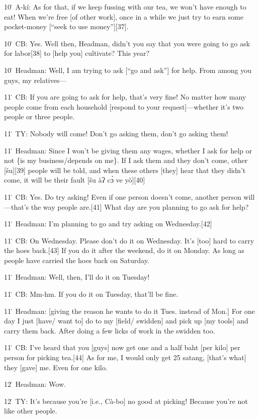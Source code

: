 10\. A-kí: As for that, if we keep fussing with our tea, we won't have enough
to eat!  When we're free [of other work], once in a while we just try to earn some
pocket-money [``seek to use money''][37].

10\. CB: Yes. Well then, Headman, didn't you say that you were going to go ask
for labor[38] to [help you] cultivate?  This year?

10\. Headman: Well, I am trying to ask [``go and ask''] for help.  From among you
guys, my relatives---

11\. CB: If you are going to ask for help, that's very fine!  No matter how many
people come from each household [respond to your request]---whether it's two people
or three people.

11\. TY: Nobody will come!  Don't go asking them, don't go asking them!

11\. Headman: Since I won't be giving them any wages, whether I ask for help or
not \{is my business/depends on me\}.  If I ask them and they don't come, other
[šu][39] people will be told, and when these others [they] hear that they didn't
come, it will be their fault [šu àʔ cɔ̀ ve yò][40]

11\. CB: Yes.  Do try asking! Even if one person doesn't come, another person will---that's
the way people are.[41]  What day are you planning to go ask for help?

11\. Headman: I'm planning to go and try asking on Wednesday.[42]

11\. CB: On Wednesday.  Please don't do it on Wednesday.  It's [too] hard to carry
the hoes back.[43]  If you do it after the weekend, do it on Monday.  As long as
people have carried the hoes back on Saturday.

11\. Headman: Well, then, I'll do it on Tuesday!

11\. CB: Mm-hm.  If you do it on Tuesday, that'll be fine.

11\. Headman: [giving the reason he wants to do it Tues. instead of Mon.] For one
day I just [have/ want to] do to my [field/ swidden] and pick up [my tools] and
carry them back.  After doing a few licks of work in the swidden too.

11\. CB: I've heard that you [guys] now get one and a half baht [per kilo] per
person for picking tea.[44]  As for me, I would only get 25 satang, [that's what]
they [gave] me.  Even for one kilo.

12\. Headman: Wow.

12\. TY: It's because you're [i.e., Cà-bo] no good at picking!  Because you're
not like other people.

